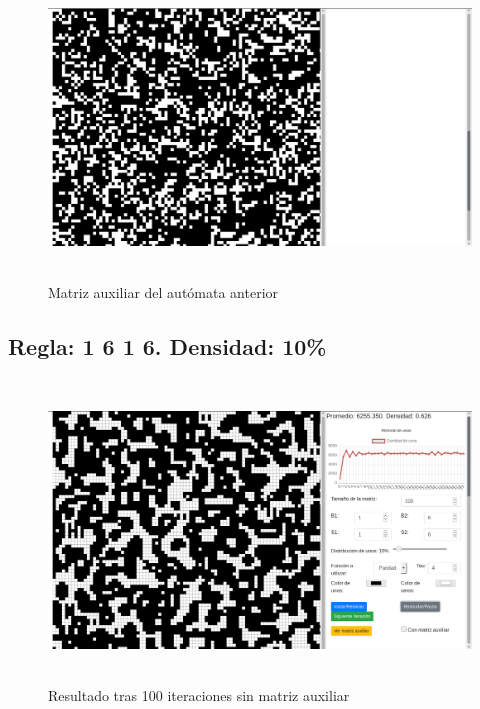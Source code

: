 \documentclass[12pt, titlepage]{article}
\begin{document}
\begin{figure}[H]
\begin{center}
 \includegraphics[width=15cm, height=8cm]{./img/3634-paridad-aux.png}
 \caption{Matriz auxiliar del autómata anterior}
 \label{fig:3634-paridad-aux}
\end{center}
\end{figure}

\subsection{Regla: 1 6 1 6. Densidad: 10\%}

\begin{figure}[H]
\begin{center}
 \includegraphics[width=15cm, height=8cm]{./img/1616.png}
 \caption{Resultado tras 100 iteraciones sin matriz auxiliar}
 \label{fig:1616}
\end{center}
\end{figure}
\end{document}
